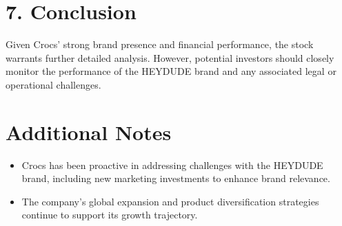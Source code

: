 \documentclass[12pt]{article}
\begin{document}
\section*{7. Conclusion}
Given Crocs' strong brand presence and financial performance, the stock warrants further detailed analysis. However, potential investors should closely monitor the performance of the HEYDUDE brand and any associated legal or operational challenges.

\section*{Additional Notes}
\begin{itemize}
    \item Crocs has been proactive in addressing challenges with the HEYDUDE brand, including new marketing investments to enhance brand relevance.
    \item The company's global expansion and product diversification strategies continue to support its growth trajectory.
\end{itemize}
\end{document}
